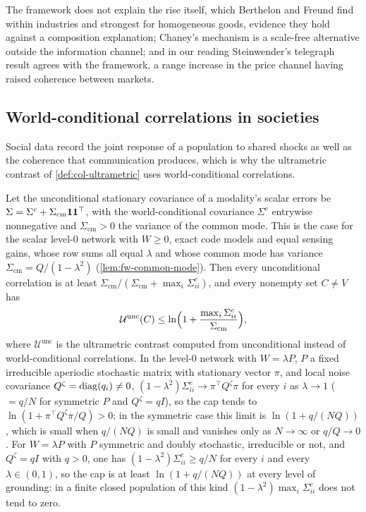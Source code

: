 The framework does not explain the rise itself, which Berthelon and Freund find within industries and strongest for homogeneous goods, evidence they hold against a composition explanation; Chaney's mechanism is a scale-free alternative outside the information channel; and in our reading Steinwender's telegraph result agrees with the framework, a range increase in the price channel having raised coherence between markets.

\subsection{World-conditional correlations in societies}\label{sec:abs-world}

Social data record the joint response of a population to shared shocks as well as the coherence that communication produces, which is why the ultrametric contrast of \cref{def:col-ultrametric} uses world-conditional correlations.

\begin{proposition}\label{prop:abs-ultrametric-cap}
Let the unconditional stationary covariance of a modality's scalar errors be $\Sigma=\Sigma^c+\Sigma_{\mathrm{cm}}\mathbf{1}\mathbf{1}^\top$, with the world-conditional covariance $\Sigma^c$ entrywise nonnegative and $\Sigma_{\mathrm{cm}}>0$ the variance of the common mode. This is the case for the scalar level-0 network with $W\ge0$, exact code models and equal sensing gains, whose row sums all equal $\lambda$ and whose common mode has variance $\Sigma_{\mathrm{cm}}=Q/(1-\lambda^2)$ (\cref{lem:fw-common-mode}). Then every unconditional correlation is at least $\Sigma_{\mathrm{cm}}/(\Sigma_{\mathrm{cm}}+\max_i\Sigma^c_{ii})$, and every nonempty set $C\ne V$ has
\[
\mathcal U^{\mathrm{unc}}(C)\le\ln\Bigl(1+\frac{\max_i\Sigma^c_{ii}}{\Sigma_{\mathrm{cm}}}\Bigr),
\]
where $\mathcal U^{\mathrm{unc}}$ is the ultrametric contrast computed from unconditional instead of world-conditional correlations. In the level-0 network with $W=\lambda P$, $P$ a fixed irreducible aperiodic stochastic matrix with stationary vector $\pi$, and local noise covariance $Q^\zeta=\operatorname{diag}(q_i)\ne0$, $(1-\lambda^2)\Sigma^c_{ii}\to\pi^\top Q^\zeta\pi$ for every $i$ as $\lambda\to1$ ($=q/N$ for symmetric $P$ and $Q^\zeta=qI$), so the cap tends to $\ln(1+\pi^\top Q^\zeta\pi/Q)>0$; in the symmetric case this limit is $\ln(1+q/(NQ))$, which is small when $q/(NQ)$ is small and vanishes only as $N\to\infty$ or $q/Q\to0$. For $W=\lambda P$ with $P$ symmetric and doubly stochastic, irreducible or not, and $Q^\zeta=qI$ with $q>0$, one has $(1-\lambda^2)\Sigma^c_{ii}\ge q/N$ for every $i$ and every $\lambda\in(0,1)$, so the cap is at least $\ln(1+q/(NQ))$ at every level of grounding: in a finite closed population of this kind $(1-\lambda^2)\max_i\Sigma^c_{ii}$ does not tend to zero.
\end{proposition}

